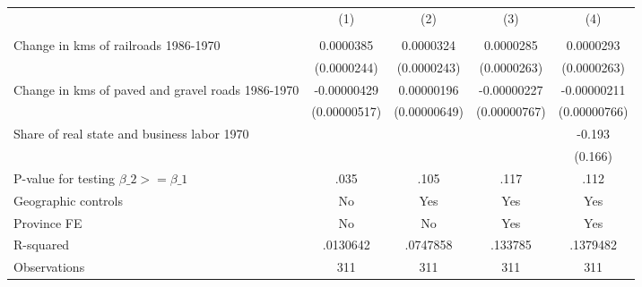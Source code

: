 {
\def\sym#1{\ifmmode^{#1}\else\(^{#1}\)\fi}
\begin{tabular}{l*{4}{c}}
\hline\hline
                &\multicolumn{1}{c}{(1)}&\multicolumn{1}{c}{(2)}&\multicolumn{1}{c}{(3)}&\multicolumn{1}{c}{(4)}\\
                &\multicolumn{1}{c}{}&\multicolumn{1}{c}{}&\multicolumn{1}{c}{}&\multicolumn{1}{c}{}\\
\hline
Change in kms of railroads 1986-1970&0.0000385         &0.0000324         &0.0000285         &0.0000293         \\
                &(0.0000244)         &(0.0000243)         &(0.0000263)         &(0.0000263)         \\
[1em]
Change in kms of paved and gravel roads 1986-1970&-0.00000429         &0.00000196         &-0.00000227         &-0.00000211         \\
                &(0.00000517)         &(0.00000649)         &(0.00000767)         &(0.00000766)         \\
[1em]
Share of real state and business labor 1970&                  &                  &                  &   -0.193         \\
                &                  &                  &                  &  (0.166)         \\
\hline
P-value for testing $\beta\_{2} >= \beta\_{1}$&     .035         &     .105         &     .117         &     .112         \\
Geographic controls&       No         &      Yes         &      Yes         &      Yes         \\
Province FE     &       No         &       No         &      Yes         &      Yes         \\
R-squared       & .0130642         & .0747858         &  .133785         & .1379482         \\
Observations    &      311         &      311         &      311         &      311         \\
\hline\hline
\end{tabular}
}
